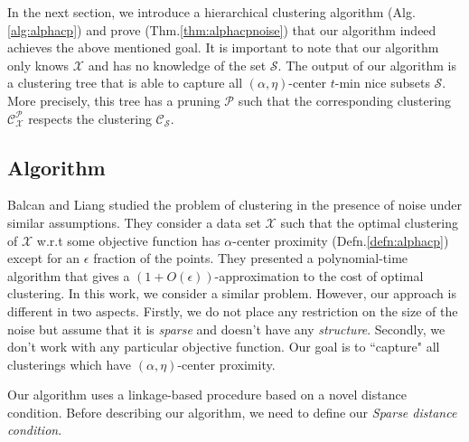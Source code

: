 \documentclass[11pt]{article}
\newcommand{\mc}{\mathcal}
\begin{document}
In the next section, we introduce a hierarchical clustering algorithm (Alg.\ref{alg:alphacp}) and prove (Thm.\ref{thm:alphacpnoise}) that our algorithm indeed achieves the above mentioned goal.
It is important to note that our algorithm only knows $\mc X$ and has no knowledge of the set $\mc S$.
The output of our algorithm is a clustering tree that is able to capture all $(\alpha, \eta)$-center $t$-min nice subsets $\mc S$. More precisely, this tree has a pruning $\mc P$ such that the corresponding clustering $\mc C_{\mc X}^{\mc P}$ respects the clustering $\mc C_{\mc S}$. 

\subsection{Algorithm}
Balcan and Liang studied the problem of clustering in the presence of noise under similar assumptions. They consider a data set $\mc X$ such that the optimal clustering of $\mc X$ w.r.t some objective function has $\alpha$-center proximity (Defn.\ref{defn:alphacp}) except for an $\epsilon$ fraction of the points. They presented a polynomial-time algorithm that gives a $(1+O(\epsilon))$-approximation to the cost of optimal clustering. %
In this work, we consider a similar problem. However, our approach is different in two aspects. Firstly, we do not place any restriction on the size of the noise but assume that it is {\it sparse} and doesn't have any {\it structure}. Secondly, we don't work with any particular objective function. Our goal is to ``capture" all clusterings which have $(\alpha, \eta)$-center proximity.

Our algorithm uses a linkage-based procedure based on a novel distance condition. Before describing our algorithm, we need to define our {\it Sparse distance condition}.
\end{document}
